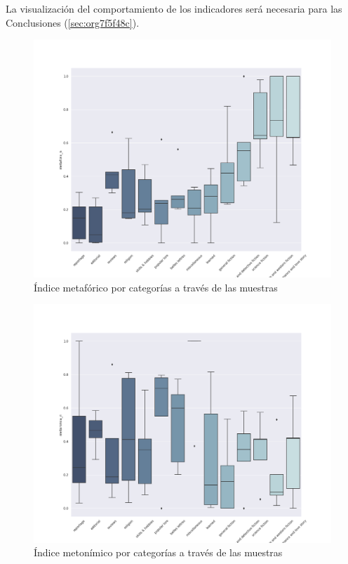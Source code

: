 \documentclass[12pt,letterpaper,twoside]{article}
\begin{document}
La visualización del comportamiento de los indicadores será necesaria para las Conclusiones (\ref{sec:org7f5f48c}).

\begin{figure}[H]
\centering
\includegraphics[width=0.9\linewidth]{./resultados/graphs/total/accum_cat_metafora.png}
\caption{\label{fig:metafora_categorias} Índice metafórico por categorías a través de las muestras }
\end{figure}
\begin{figure}[H]
\centering
\includegraphics[width=0.9\linewidth]{./resultados/graphs/total/accum_cat_metonimia.png}
\caption{\label{fig:metonimia_categorias} Índice metonímico por categorías a través de las muestras  }
\end{figure}
\end{document}
